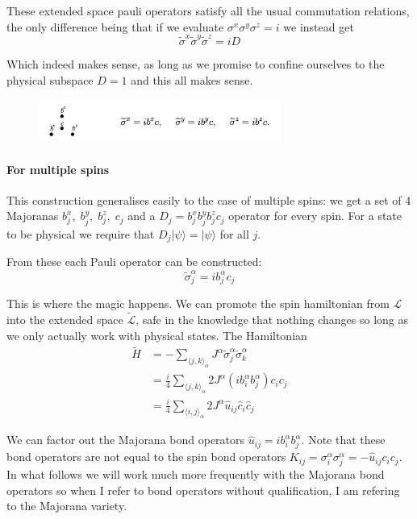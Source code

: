 These extended space pauli operators satisfy all the usual commutation
relations, the only difference being that if we evaluate
\(\sigma^x \sigma^y \sigma^z = i\) we instead get
\[ \tilde{\sigma}^x\tilde{\sigma}^y\tilde{\sigma}^z = iD \]

Which indeed makes sense, as long as we promise to confine ourselves to
the physical subspace \(D = 1\) and this all makes sense.

\begin{figure}
\hypertarget{fig:majorana}{%
\centering
\includegraphics[width=0.71\textwidth,height=\textheight]{figure_code/majorana.png}
\caption{}\label{fig:majorana}
}
\end{figure}

\hypertarget{for-multiple-spins}{%
\paragraph{For multiple spins}\label{for-multiple-spins}}

This construction generalises easily to the case of multiple spins: we
get a set of 4 Majoranas \(b^x_j,\; b^y_j,\;b^z_j,\; c_j\) and a
\(D_j = b^x_jb^y_jb^z_jc_j\) operator for every spin. For a state to be
physical we require that \(D_j |\psi\rangle = |\psi\rangle\) for all
\(j\).

From these each Pauli operator can be constructed:
\[\tilde{\sigma}^\alpha_j = i b^\alpha_j c_j\]

This is where the magic happens. We can promote the spin hamiltonian
from \(\mathcal{L}\) into the extended space \(\mathcal{\tilde{L}}\),
safe in the knowledge that nothing changes so long as we only actually
work with physical states. The Hamiltonian \[\begin{aligned}
\tilde{H} &=  - \sum_{\langle j,k\rangle_\alpha} J^{\alpha}\tilde{\sigma}_j^{\alpha}\tilde{\sigma}_k^{\alpha}\\
          &= \frac{i}{4} \sum_{\langle j,k\rangle_\alpha} 2J^{\alpha} (ib^\alpha_i b^\alpha_j) c_i c_j\\
          &=  \frac{i}{4} \sum_{\langle i,j\rangle_\alpha} 2J^{\alpha} \hat{u}_{ij} \hat{c}_i \hat{c}_j
\end{aligned}\]

We can factor out the Majorana bond operators
\(\hat{u}_{ij} = i b^\alpha_i b^\alpha_j\). Note that these bond
operators are not equal to the spin bond operators
\(K_{ij} = \sigma^\alpha_i \sigma^\alpha_j = - \hat{u}_{ij} c_i c_j\).
In what follows we will work much more frequently with the Majorana bond
operators so when I refer to bond operators without qualification, I am
refering to the Majorana variety.

